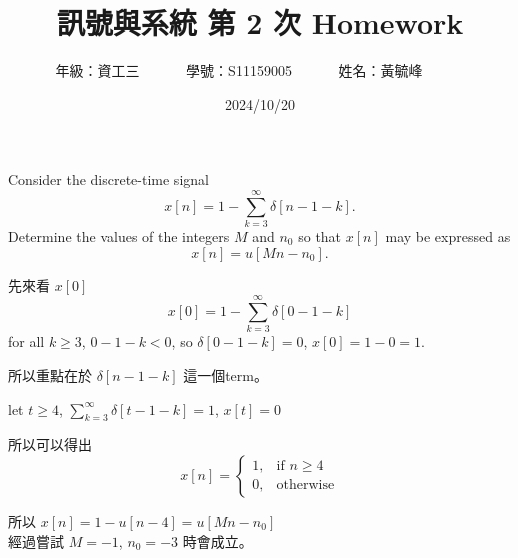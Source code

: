 \documentclass[12pt,a4paper]{article}
\begin{document}
\title{
  {
    \heiti 訊號與系統 第 2 次 Homework
  }
}


\date{2024/10/20}
\author{
  年級：{資工三}~~~~~~
  學號：{S11159005}~~~~~~
  姓名：{黃毓峰}~~~~~~
}

\maketitle
\newlength{\question}
\settowidth{\question}{XX}

\section*{\heiti \color{black}{Question - 1.12}}

\parbox[t]{\dimexpr\linewidth-\question}{
  Consider the discrete-time signal
  \[
    x[n] = 1 - \sum_{k=3}^{\infty} \delta[n - 1 - k].
  \]
      Determine the values of the integers \(M\) and \(n_0\) so that \(x[n]\) may be expressed as
  \[
  x[n] = u[Mn - n_0].
  \]
  
}


\parbox[t]{\dimexpr\linewidth-\question} {
  先來看 \(x[0]\)
  \[
    x[0] = 1 - \sum_{k=3}^{\infty} \delta[0 - 1 - k]
  \]
  for all \(k \geq 3\), \(0 - 1 - k < 0\), so \(\delta[0 - 1 - k] = 0\),
  \(
    x[0] = 1 - 0 = 1.
  \)

  所以重點在於 \(\delta[n - 1 - k]\) 這一個term。

  let \(t \geq 4\),  \(\sum_{k=3}^{\infty} \delta[t - 1 - k] = 1\),  \(x[t] = 0\)

  所以可以得出
  \[
    x[n] = 
      \begin{cases}
          1,              & \text{if } n\geq 4\\
          0,              & \text{otherwise}
      \end{cases}
  \]

  所以 \(x[n]=1- u[n-4]=u[Mn-n_0]\)\\
  經過嘗試\footnotemark{} \(M = -1\), \(n_0 = -3\) 時會成立。
}

\newpage

\section*{\heiti \color{black}{Question - 1.15}}
\end{document}
